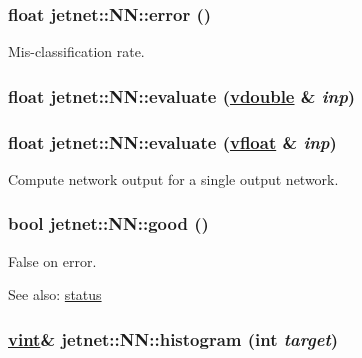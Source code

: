 \hypertarget{classjetnet_1_1NN_a28}{
\subsubsection[error]{\setlength{\rightskip}{0pt plus 5cm}float jetnet::NN::error ()}}
\label{classjetnet_1_1NN_a28}


Mis-classification rate. 

\hypertarget{classjetnet_1_1NN_a32}{
\subsubsection[evaluate]{\setlength{\rightskip}{0pt plus 5cm}float jetnet::NN::evaluate (\hyperlink{PoissonGammaFit_8hpp_a0}{vdouble} \& {\em inp})}}
\label{classjetnet_1_1NN_a32}


\hypertarget{classjetnet_1_1NN_a31}{
\subsubsection[evaluate]{\setlength{\rightskip}{0pt plus 5cm}float jetnet::NN::evaluate (\hyperlink{jetnet_8hpp_a0}{vfloat} \& {\em inp})}}
\label{classjetnet_1_1NN_a31}


Compute network output for a single output network. 

\hypertarget{classjetnet_1_1NN_a33}{
\subsubsection[good]{\setlength{\rightskip}{0pt plus 5cm}bool jetnet::NN::good ()}}
\label{classjetnet_1_1NN_a33}


False on error. 

\begin{Desc}
\item[See also:]\hyperlink{classjetnet_1_1NN_a34}{status} \end{Desc}
\hypertarget{classjetnet_1_1NN_a29}{
\subsubsection[histogram]{\setlength{\rightskip}{0pt plus 5cm}\hyperlink{jetnet_8hpp_a2}{vint}\& jetnet::NN::histogram (int {\em target})}}
\label{classjetnet_1_1NN_a29}


